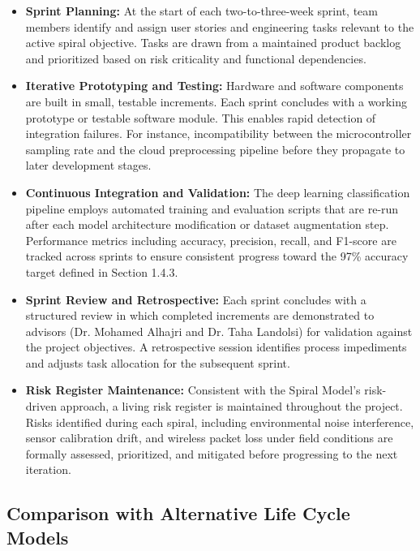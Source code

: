 \documentclass[12pt,a4paper,oneside]{memoir}
\begin{document}
\begin{itemize}
    \item \textbf{Sprint Planning:} At the start of each two-to-three-week sprint, team members
    identify and assign user stories and engineering tasks relevant to the active spiral
    objective. Tasks are drawn from a maintained product backlog and prioritized based on
    risk criticality and functional dependencies.

    \item \textbf{Iterative Prototyping and Testing:} Hardware and software components are built in
    small, testable increments. Each sprint concludes with a working prototype or testable
    software module. This enables rapid detection of integration failures. For instance,
    incompatibility between the microcontroller sampling rate and the cloud preprocessing
    pipeline before they propagate to later development stages.

    \item \textbf{Continuous Integration and Validation:} The deep learning classification pipeline
    employs automated training and evaluation scripts that are re-run after each model
    architecture modification or dataset augmentation step. Performance metrics including
    accuracy, precision, recall, and F1-score are tracked across sprints to ensure consistent
    progress toward the 97\% accuracy target defined in Section 1.4.3.

    \item \textbf{Sprint Review and Retrospective:} Each sprint concludes with a structured review in
    which completed increments are demonstrated to advisors (Dr. Mohamed Alhajri and Dr.
    Taha Landolsi) for validation against the project objectives. A retrospective session
    identifies process impediments and adjusts task allocation for the subsequent sprint.

    \item \textbf{Risk Register Maintenance:} Consistent with the Spiral Model's risk-driven
    approach, a living risk register is maintained throughout the project. Risks identified
    during each spiral, including environmental noise interference, sensor calibration drift,
    and wireless packet loss under field conditions are formally assessed, prioritized, and
    mitigated before progressing to the next iteration.
\end{itemize}

\subsection{Comparison with Alternative Life Cycle Models}
\end{document}
